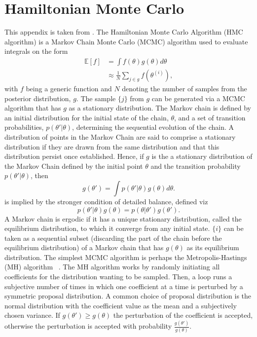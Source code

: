 \chapter{Hamiltonian Monte Carlo}
\label{app:HMC}
This appendix is taken from \citet{petersen2020}. The Hamiltonian Monte Carlo Algorithm (HMC algorithm) is a Markov Chain Monte Carlo (MCMC) algorithm used to evaluate integrals on the form
\begin{equation}
	\begin{split}
		\mathbb{E}[f] &= \int f(\theta)g(\theta)d\theta\\
		& \approx \frac{1}{N}\sum_{j\in g}f(\theta^{(i)}),
	\end{split}
\end{equation}
with $f$ being a generic function and $N$ denoting the number of samples from the posterior distribution, $g$. The sample $\{j\}$ from $g$ can be generated via a MCMC algorithm that has $g$ as a stationary distribution. The Markov chain is defined by an initial distribution for the initial state of the chain, $\theta$, and a set of transition probabilities, $p(\theta'|\theta)$, determining the sequential evolution of the chain. A distribution of points in the Markov Chain are said to comprise a stationary distribution if they are drawn from the same distribution and that this distribution persist once established. Hence, if $g$ is the a stationary distribution of the Markov Chain defined by the initial point $\theta$ and the transition probability $p(\theta'|\theta)$, then~\citep{Neal:1996}
\begin{equation}
	g(\theta')=\int p(\theta'|\theta)g(\theta)d\theta.
	\label{ee1}
\end{equation}
 is implied by the stronger condition of detailed balance, defined viz
\begin{equation}
	p(\theta'|\theta)g(\theta)=p(\theta|\theta')g(\theta').
\end{equation}
A Markov chain is ergodic if it has a unique stationary distribution, called the equilibrium distribution, to which it converge from any initial state. $\{i\}$ can be taken as a sequential subset (discarding the part of the chain before the equilibrium distribution) of a Markov chain that has $g(\theta)$ as its equilibrium distribution. \newline
The simplest MCMC algorithm is perhaps the Metropolis-Hastings (MH) algorithm ~\citep{Metropolis1953,hastings70}. The MH algorithm works by randomly initiating all coefficients for the distribution wanting to be sampled. Then, a loop runs a subjective number of times in which one coefficient at a time is perturbed by a symmetric proposal distribution. A common choice of proposal distribution is the normal distribution with the coefficient value as the mean and a subjectively chosen variance. If $g(\theta')\geq g(\theta)$ the perturbation of the coefficient is accepted, otherwise the perturbation is accepted with probability $\frac{g(\theta')}{g(\theta)}$.\newline
